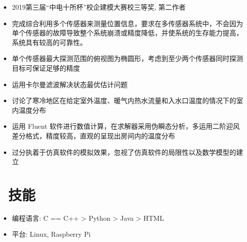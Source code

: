 \documentclass{resume}
\begin{document}
{
\begin{itemize}
  \item 2019第三届“中电十所杯”校企建模大赛校三等奖, 第二作者
  \item 完成综合利用多个传感器来测量位置信息，要求在多传感器系统中，不会因为单个传感器的故障导致整个系统崩溃或精度降低，并使系统的生存能力提高，系统具有较高的可靠性。
  \item 单个传感器最大探测范围的俯视图为椭圆形，考虑到至少两个传感器同时探测目标可保证足够的精度
  \item 运用卡尔曼滤波解决状态最优估计问题
\end{itemize}

\begin{itemize}
  \item 讨论了寒冷地区在给定室外温度、暖气内热水流量和入水口温度的情况下的室内温度分布
  \item 运用 Fluent 软件进行数值计算，在求解器采用伪瞬态分析，多运用二阶迎风差分格式，精度较高，直观的呈现出房间内的温度分布
  \item 过分执着于仿真软件的模拟效果，忽视了仿真软件的局限性以及数学模型的建立
\end{itemize}



\section{\faCogs\ 技能}
\begin{itemize}[parsep=0.5ex]
  \item 编程语言: C == C++ > Python > Java > HTML
  \item 平台: Linux, Raspberry Pi
\end{itemize}

}
\end{document}
